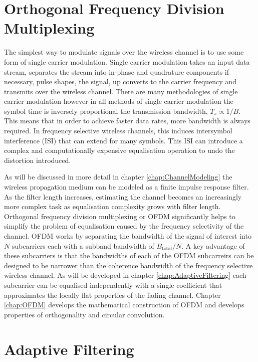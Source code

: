 \section{Orthogonal Frequency Division Multiplexing}
\label{sec:OFDMIntro}
The simplest way to modulate signals over the wireless %
channel is to use some form of single carrier modulation. %
Single carrier modulation takes an input data stream, %
separates the stream into in-phase and quadrature components %
if necessary, pulse shapes, the signal, up converts to the %
carrier frequency and transmits over the wireless channel. %
There are many methodologies of single carrier modulation %
however in all methods of single carrier modulation %
the symbol time is inversely proportional the transmission %
bandwidth, $T_{s} \propto 1/B$. This means that in order to %
achieve faster data rates, more bandwidth is always required. %
In frequency selective wireless channels, this induces intersymbol %
interference (ISI) that can extend for many symbols. This ISI %
can introduce a complex and computationally expensive equalisation %
operation to undo the distortion introduced.

As will be discussed in more detail in chapter %
\ref{chap:ChannelModeling} the wireless propagation medium can be %
modeled as a finite impulse response filter\cite{Jer00}. 
As the filter length increases, estimating %
the channel becomes an increasingly more complex task as %
equalisation complexity grows with filter length. %
Orthogonal frequency division multiplexing or OFDM significantly %
helps to simplify the problem of equalisation caused by %
the frequency selectivity of the channel. OFDM works by %
separating the bandwidth of the signal of interest into %
$N$ subcarriers each with a subband bandwidth of %
$B_{\text{total}}/N$. A key advantage of these subcarriers %
is that the bandwidths of each of the OFDM subcarreirs can %
be designed to be narrower than the coherence bandwidth %
of the frequency selective wireless channel. As will be %
developed in chapter \ref{chap:AdaptiveFiltering} each %
subcarrier can be equalised independently with a single %
coefficient that approximates the locally flat properties %
of the fading channel. Chapter \ref{chap:OFDM} develops %
the mathematical construction of OFDM and develops %
properties of orthogonality and circular convolution.
\newpage
\section{Adaptive Filtering}

